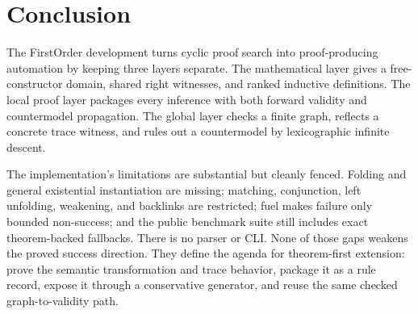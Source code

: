 \documentclass[11pt,oneside]{book}
\begin{document}
\backmatter
\chapter*{Conclusion}

The FirstOrder development turns cyclic proof search into proof-producing
automation by keeping three layers separate.  The mathematical layer gives a
free-constructor domain, shared right witnesses, and ranked inductive
definitions.  The local proof layer packages every inference with both forward
validity and countermodel propagation.  The global layer checks a finite graph,
reflects a concrete trace witness, and rules out a countermodel by lexicographic
infinite descent.

The implementation's limitations are substantial but cleanly fenced.  Folding
and general existential instantiation are missing; matching, conjunction, left
unfolding, weakening, and backlinks are restricted; fuel makes failure only
bounded non-success; and the public benchmark suite still includes exact
theorem-backed fallbacks.  There is no parser or CLI.  None of those gaps weakens
the proved success direction.  They define the agenda for theorem-first
extension: prove the semantic transformation and trace behavior, package it as
a rule record, expose it through a conservative generator, and reuse the same
checked graph-to-validity path.
\end{document}
